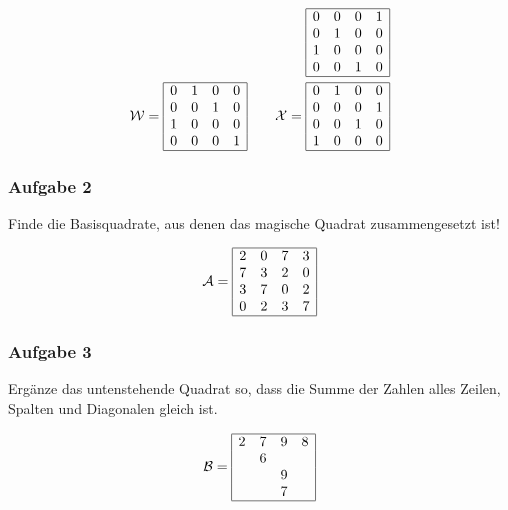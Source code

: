 \documentclass[11pt]{beamer}
\begin{document}
\begin{frame}
\begin{align*}
	\begin{array}{|cccc|}
	\hline
	0 & 0 & 0 & 1 \\ 
	0 & 1 & 0 & 0 \\ 
	1 & 0 & 0 & 0 \\ 
	0 & 0 & 1 & 0 \\
	\hline
	\end{array}
	\\
	\mathcal{W} = 
	\begin{array}{|cccc|}
	\hline
	0 & 1 & 0 & 0 \\ 
	0 & 0 & 1 & 0 \\ 
	1 & 0 & 0 & 0 \\ 
	0 & 0 & 0 & 1 \\
	\hline
	\end{array}
	\qquad
	\mathcal{X} = 
	\begin{array}{|cccc|}
	\hline
	0 & 1 & 0 & 0 \\ 
	0 & 0 & 0 & 1 \\ 
	0 & 0 & 1 & 0 \\ 
	1 & 0 & 0 & 0 \\
	\hline
	\end{array}   
	\end{align*}	
\end{frame}

\begin{frame}
	\frametitle{Aufgabe 2}
	\begin{center}
		Finde die Basisquadrate, aus denen das magische Quadrat zusammengesetzt ist!
		
		\begin{align*}
		\mathcal{A} =
		\begin{array}{|cccc|}
		\hline
		2 & 0 & 7 & 3 \\ 
		7 & 3 & 2 & 0 \\ 
		3 & 7 & 0 & 2 \\ 
		0 & 2 & 3 & 7 \\
		\hline
		\end{array}  
		\end{align*}
	\end{center}
\end{frame}

\begin{frame}
\frametitle{Aufgabe 3}
\begin{center}
	
	Erg\"anze das untenstehende Quadrat so, dass die Summe der Zahlen alles Zeilen, Spalten und Diagonalen gleich ist. 
\end{center}
\begin{align*}
\mathcal{B} =
\begin{array}{|cccc|}
\hline
2 & 7 & 9 & 8 \\ 
& 6 &  &  \\ 
&  & 9 &  \\ 
&  & 7 &  \\
\hline
\end{array}  
\end{align*}
\end{frame}
\end{document}
